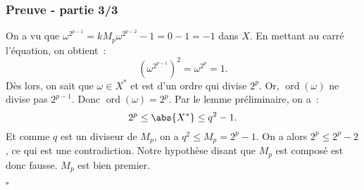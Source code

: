 \documentclass[10pt, mathserif]{beamer}
\DeclareMathOperator{\ord}{ord}
\theoremstyle{definition}
\theoremstyle{remark}
\begin{document}
	\begin{frame}
		\frametitle{Preuve - partie 3/3}

		On a vu que $\omega^{2^{p-1}} = kM_p\omega^{2^{p-2}} - 1 = 0 - 1 = -1$ dans $X$. En mettant au carré l'équation, on obtient~:
		\[\left(\omega^{2^{p-1}}\right)^2 = \omega^{2^p} = 1.\]
		Dès lors, on sait que $\omega \in X^*$ et est d'un ordre qui divise $2^p$. Or, $\ord(\omega)$ ne divise pas $2^{p-1}$. Donc $\ord(\omega) = 2^p$.
		Par le lemme préliminaire, on a~:
		\[2^p \leq \abs {X^*} \leq q^2 - 1.\]
		Et comme $q$ est un diviseur de $M_p$, on a $q^2 \leq M_p = 2^p-1$. On a alors $2^p \leq 2^p - 2$, ce qui est une contradiction. Notre hypothèse disant que
		$M_p$ est composé est donc fausse. $M_p$ est bien premier.
		
		\begin{flushright}$\square$\end{flushright}
	\end{frame}
\end{document}
